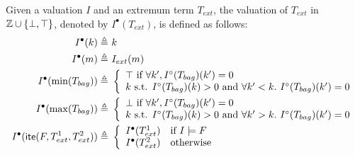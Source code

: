 Given a valuation $I$ and an extremum term $T_{ext}$, the valuation of $T_{ext}$ in $\mathbb{Z}\cup\{\bot,\top\}$,
denoted by $I^{\bullet}(T_{ext})$, is defined as follows:
\begin{align*}
I^{\bullet}(k) \triangleq&\ k
\\
I^{\bullet}(m) \triangleq&\ I_{ext}(m)
\\
I^{\bullet}(\min(T_{bag})) \triangleq&\
\left\{\begin{array}{ll}
\top \mbox{ if } \forall k',I^\circ(T_{bag})(k')=0 \\
k \mbox{ s.t. } I^\circ(T_{bag})(k) > 0 \mbox{ and }\forall k'< k.~I^\circ(T_{bag})(k')=0
\end{array}\right.
\\
I^{\bullet}(\max(T_{bag})) \triangleq&\
\left\{\begin{array}{ll}
\bot \mbox{ if } \forall k',I^\circ(T_{bag})(k')=0 \\
k \mbox{ s.t. } I^\circ(T_{bag})(k) > 0 \mbox{ and }\forall k'> k.~I^\circ(T_{bag})(k')=0
\end{array}\right.
\\
I^{\bullet}(\textsf{ite}(F, T^1_{ext}, T^2_{ext})) \triangleq&\
\left\{\begin{array}{ll}
I^{\bullet}(T^1_{ext}) & \mbox{if } I\models F \\
I^{\bullet}(T^2_{ext}) & \mbox{otherwise}
\end{array}\right.
\end{align*}

